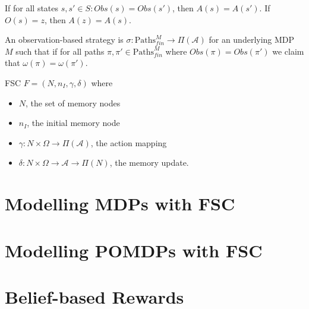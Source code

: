 If for all states $s,s'\in S: Obs(s)=Obs(s')$, then $A(s)=A(s')$.
If $O(s)=z$, then $A(z)=A(s)$.

\begin{definition}
	An observation-based strategy is $\sigma:\text{Paths}^M_{fin}\to \Pi(\mathcal{A})$ for an underlying MDP $M$ such that if for all paths $\pi,\pi'\in\text{Paths}^M_{fin}$ where $Obs(\pi)=Obs(\pi')$ we claim that $\omega(\pi)=\omega(\pi')$.
\end{definition}

\begin{definition}
	FSC $F=(N,n_I,\gamma,\delta)$ where
	\begin{itemize}
		\item $N$, the set of memory nodes
		\item $n_I$, the initial memory node
		\item $\gamma:N\times \Omega \to \Pi(\mathcal{A})$, the action mapping
		\item $\delta:N\times \Omega \to \mathcal{A} \to \Pi(N)$, the memory update. 
	\end{itemize}
\end{definition}
	

\section{Modelling MDPs with FSC}

\section{Modelling POMDPs with FSC}

\section{Belief-based Rewards}